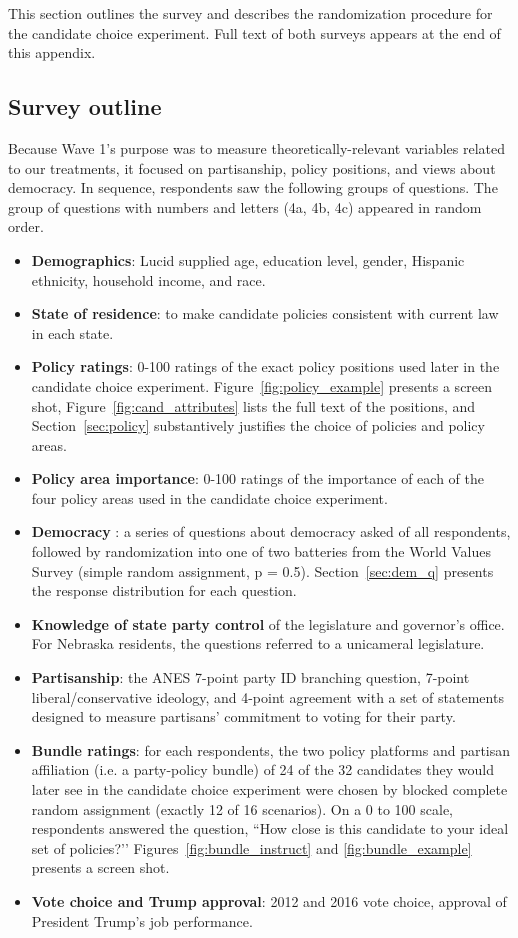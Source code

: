 \documentclass[12pt]{article}
\begin{document}
This section outlines the survey and describes the randomization procedure for the candidate choice experiment. Full text of both surveys appears at the end of this appendix.

\subsection{Survey outline}

Because Wave 1’s purpose was to measure theoretically-relevant variables related to our treatments, it focused on partisanship, policy positions, and views about democracy. In sequence, respondents saw the following groups of questions. The group of questions with numbers and letters (4a, 4b, 4c) appeared in random order.

\begin{itemize}
\singlespacing
\item[0.] \textbf{Demographics}: Lucid supplied age, education level, gender, Hispanic ethnicity, household income, and race.
\item[1.] \textbf{State of residence}: to make candidate policies consistent with current law in each state.
\item[2.] \textbf{Policy ratings}: 0-100 ratings of the exact policy positions used later in the candidate choice experiment. Figure~\ref{fig:policy_example} presents a screen shot, Figure~\ref{fig:cand_attributes} lists the full text of the positions, and Section~\ref{sec:policy} substantively justifies the choice of policies and policy areas.
\item[3.] \textbf{Policy area importance}: 0-100 ratings of the importance of each of the four policy areas used in the candidate choice experiment.
\item[4a.] \textbf{Democracy }: a series of questions about democracy asked of all respondents, followed by randomization into one of two batteries from the World Values Survey (simple random assignment, p = 0.5). Section~\ref{sec:dem_q} presents the response distribution for each question.
\item[4b.] \textbf{Knowledge of state party control} of the legislature and governor’s office. For Nebraska residents, the questions referred to a unicameral legislature.
\item[4c.] \textbf{Partisanship}: the ANES 7-point party ID branching question, 7-point liberal/conservative ideology, and 4-point agreement with a set of statements designed to measure partisans’ commitment to voting for their party.
\item[5.] \textbf{Bundle ratings}: for each respondents, the two policy platforms and partisan affiliation (i.e. a party-policy bundle) of 24 of the 32 candidates they would later see in the candidate choice experiment were chosen by blocked complete random assignment (exactly 12 of 16 scenarios). On a 0 to 100 scale, respondents answered the question, ``How close is this candidate to your ideal set of policies?’’ Figures~\ref{fig:bundle_instruct} and \ref{fig:bundle_example} presents a screen shot.
\item[6.] \textbf{Vote choice and Trump approval}: 2012 and 2016 vote choice, approval of President Trump’s job performance.
\end{itemize}
\end{document}
